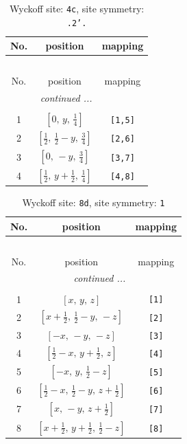 \documentclass[fleqn,8pt]{jsarticle}
\begin{document}
\renewcommand{\arraystretch}{1.2}
\begin{longtable}{ccc}
\caption{Wyckoff site: {\tt 4c}, site symmetry: {\tt .2'.}}
 \\
 \hline \hline
No. & position & mapping \\ \hline \endfirsthead

\multicolumn{2}{l}{\tablename\ \thetable{}} \\
 \hline \hline
No. & position & mapping \\ \hline \endhead

 \hline \hline
\multicolumn{2}{r}{\footnotesize\it continued ...} \\ \endfoot

 \hline \hline
\multicolumn{2}{r}{} \\ \endlastfoot

1 & $\left[ 0,\, y,\, \frac{1}{4} \right]$ & {\tt [1,5]} \\ \hline
2 & $\left[ \frac{1}{2},\, \frac{1}{2} - y,\, \frac{3}{4} \right]$ & {\tt [2,6]} \\ \hline
3 & $\left[ 0,\, - y,\, \frac{3}{4} \right]$ & {\tt [3,7]} \\ \hline
4 & $\left[ \frac{1}{2},\, y + \frac{1}{2},\, \frac{1}{4} \right]$ & {\tt [4,8]} \\
\end{longtable}
\renewcommand{\arraystretch}{1.2}
\begin{longtable}{ccc}
\caption{Wyckoff site: {\tt 8d}, site symmetry: {\tt 1}}
 \\
 \hline \hline
No. & position & mapping \\ \hline \endfirsthead

\multicolumn{2}{l}{\tablename\ \thetable{}} \\
 \hline \hline
No. & position & mapping \\ \hline \endhead

 \hline \hline
\multicolumn{2}{r}{\footnotesize\it continued ...} \\ \endfoot

 \hline \hline
\multicolumn{2}{r}{} \\ \endlastfoot

1 & $\left[ x,\, y,\, z \right]$ & {\tt [1]} \\ \hline
2 & $\left[ x + \frac{1}{2},\, \frac{1}{2} - y,\, - z \right]$ & {\tt [2]} \\ \hline
3 & $\left[ - x,\, - y,\, - z \right]$ & {\tt [3]} \\ \hline
4 & $\left[ \frac{1}{2} - x,\, y + \frac{1}{2},\, z \right]$ & {\tt [4]} \\ \hline
5 & $\left[ - x,\, y,\, \frac{1}{2} - z \right]$ & {\tt [5]} \\ \hline
6 & $\left[ \frac{1}{2} - x,\, \frac{1}{2} - y,\, z + \frac{1}{2} \right]$ & {\tt [6]} \\ \hline
7 & $\left[ x,\, - y,\, z + \frac{1}{2} \right]$ & {\tt [7]} \\ \hline
8 & $\left[ x + \frac{1}{2},\, y + \frac{1}{2},\, \frac{1}{2} - z \right]$ & {\tt [8]} \\
\end{longtable}
\end{document}
